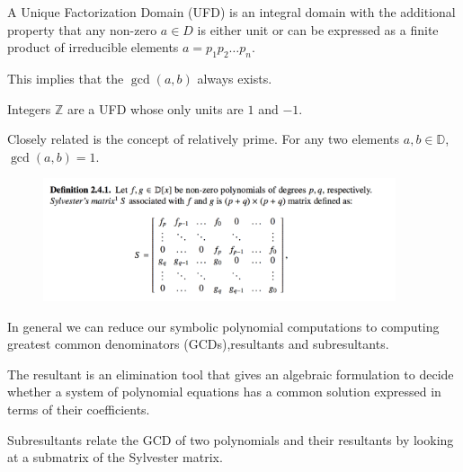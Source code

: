 \documentclass{beamer}
\begin{document}
	\begin{frame}
		
		
		A Unique Factorization Domain (UFD) is an integral domain with the additional property that any non-zero $a \in D$ is either unit or can  be expressed as a finite product of irreducible elements $a = p_1p_2\dots p_n$.	
		
		\vspace{0.2in}
		
		This implies that the $\gcd(a,b)$ always exists.
		\vspace{0.2in}
		
		Integers $\mathbb{Z}$ are a UFD whose only units are $1$ and $-1$.
		\vspace{0.2in}
		
		Closely related is the concept of relatively prime. For any two elements $a,b \in \mathbb{D}$, $\gcd(a,b) = 1$.
					
	\end{frame}
	
	\begin{frame}
		
			\begin{figure}[!ht]
				\centering
				\includegraphics[width=0.925\textwidth]{../Code/Images/sylv_matrix.png}
			\end{figure}
			
		
		In general we can reduce our symbolic polynomial computations to computing greatest common denominators (GCDs),resultants and subresultants.
		\vspace{0.2in}
		
		The resultant is an elimination tool that gives an algebraic formulation to decide whether a system of polynomial equations has a common solution expressed in terms of their coefficients.
		\vspace{0.2in}
			
		Subresultants relate the GCD of two polynomials and their resultants by looking at a submatrix of the Sylvester matrix.
		
		\vspace{0.2in}
		
	
		
		
		
		
	\end{frame}
	
\end{document}
